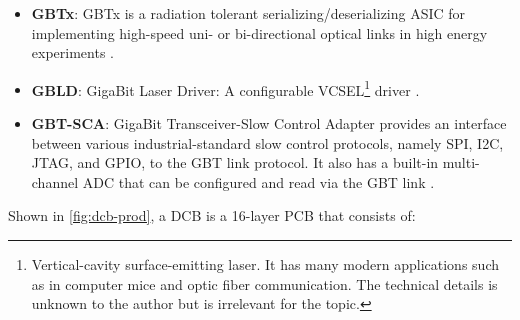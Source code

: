 \begin{itemize}
    \item \textbf{GBTx}:
        GBTx is a radiation tolerant serializing/deserializing ASIC for
        implementing high-speed uni- or bi-directional optical links in high
        energy experiments
        \cite{gbtx_manual}.

    \item \textbf{GBLD}:
        GigaBit Laser Driver:
        A configurable VCSEL\footnote{
            Vertical-cavity surface-emitting laser.
            It has many modern applications such as in computer mice and optic
            fiber communication.
            The technical details is unknown to the author but is irrelevant
            for the topic.
        } driver
        \cite{gbld_manual}.

    \item \textbf{GBT-SCA}:
        GigaBit Transceiver-Slow Control Adapter provides an interface between
        various industrial-standard slow control protocols,
        namely SPI, I2C, JTAG, and GPIO, to the GBT link protocol.
        It also has a built-in multi-channel ADC that can be configured and
        read via the GBT link \cite{sca_manual}.
\end{itemize}

Shown in \cref{fig:dcb-prod}, a DCB is a 16-layer PCB that consists of:
\label{dcb-layout}

